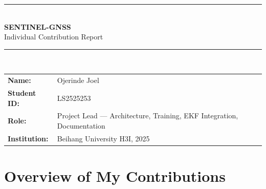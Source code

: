 \documentclass[12pt,a4paper]{article}
\begin{document}
\begin{center}
  {\color{buaaNavy}\rule{\linewidth}{2pt}}\\[0.5cm]
  {\LARGE\bfseries\color{buaaNavy} SENTINEL-GNSS}\\[0.3cm]
  {\large\color{buaaBlue} Individual Contribution Report}\\[0.5cm]
  {\color{buaaNavy}\rule{\linewidth}{2pt}}\\[0.8cm]

  \begin{tabular}{ll}
    \textbf{Name:}       & Ojerinde Joel \\
    \textbf{Student ID:} & LS2525253 \\
    \textbf{Role:}       & Project Lead — Architecture, Training, EKF Integration,
                           Documentation \\
    \textbf{Institution:}& Beihang University H3I, 2025 \\
  \end{tabular}
\end{center}
\vspace{1cm}

\begin{abstract}
This report documents my personal contributions to the SENTINEL-GNSS project:
a Transformer--LSTM neural network for proactive prediction of GNSS signal
degradation in autonomous vehicle navigation.
My responsibilities spanned the full technical pipeline: GitHub repository creation
and project architecture, neural network design and training, 9-state EKF formulation
with adaptive SENTINEL integration, Huber robust EKF implementation, Bootstrap Particle
Filter design, inference engine packaging, and the complete documentation suite
(three comprehensive technical documents).
I also coordinated all paper writing: methodology, experiments, and abstracts.
The model I designed achieves Macro-F1\,=\,0.821 at the +5\,s prediction horizon,
with an integrated EKF delivering 48.8\,\% reduction in degraded-segment positioning
RMSE on the Trimble Shinjuku real-world dataset.
\end{abstract}

\tableofcontents
\newpage

\section{Overview of My Contributions}
\end{document}
